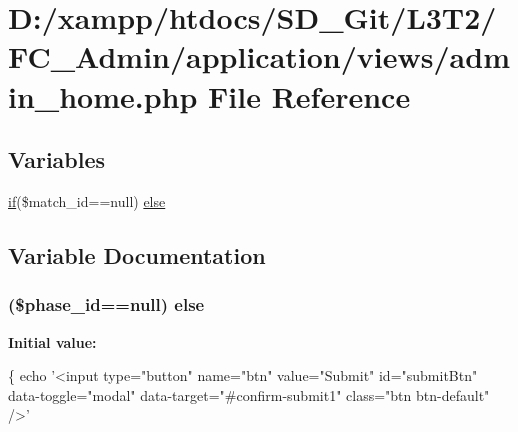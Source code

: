 \hypertarget{admin__home_8php}{}\section{D\+:/xampp/htdocs/\+S\+D\+\_\+\+Git/\+L3\+T2/\+F\+C\+\_\+\+Admin/application/views/admin\+\_\+home.php File Reference}
\label{admin__home_8php}
\subsection*{Variables}
\begin{DoxyCompactItemize}
\item 
\hyperlink{_admin_2assets_2js_2bootstrap_8min_8js_a87cf461060832b8b68a7b48d9e371e4f}{if}(\$match\+\_\+id==null) \hyperlink{admin__home_8php_af1e98bdf252a78867e822309eb424c6d}{else}
\end{DoxyCompactItemize}


\subsection{Variable Documentation}
\hypertarget{admin__home_8php_af1e98bdf252a78867e822309eb424c6d}{}
\subsubsection[{else}]{ (\$phase\+\_\+id==null) else}\label{admin__home_8php_af1e98bdf252a78867e822309eb424c6d}
{\bfseries Initial value\+:}
\begin{DoxyCode}
\{
            echo \textcolor{stringliteral}{'<input type="button" name="btn" value="Submit" id="submitBtn" data-toggle="modal"
       data-target="#confirm-submit1" class="btn btn-default" />'}
\end{DoxyCode}
